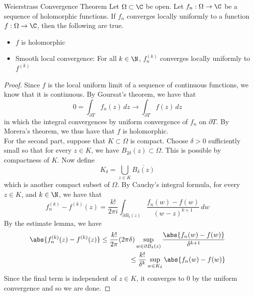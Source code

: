 \documentclass[a4paper]{article}
\begin{document}
\begin{thm}{Weierstrass Convergence Theorem}{} Let $\Omega\subset\C$ be open. Let $f_n:\Omega\to\C$ be a sequence of holomorphic functions. If $f_n$ converges locally uniformly to a function $f:\Omega\to\C$, then the following are true. 
\begin{itemize}
\item $f$ is holomorphic
\item Smooth local convergence: For all $k\in\N$, $f_n^{(k)}$ converges locally uniformly to $f^{(k)}$
\end{itemize} 
\begin{proof}
Since $f$ is the local uniform limit of a sequence of continuous functions, we know that it is continuous. By Goursat's theorem, we have that $$0=\int_{\partial T}f_n(z)\,dz\to\int_{\partial T}f(z)\,dz$$ in which the integral convergences by uniform convergence of $f_n$ on $\partial T$. By Morera's theorem, we thus have that $f$ is holomorphic. \\

For the second part, suppose that $K\subset\Omega$ is compact. Choose $\delta>0$ sufficiently small so that for every $z\in K$, we have $B_{2\delta}(z)\subset\Omega$. This is possible by compactness of $K$. Now define $$K_\delta=\bigcup_{z\in K}\overline{B_\delta(z)}$$ which is another compact subset of $\Omega$. By Cauchy's integral formula, for every $z\in K$, and $k\in\N$, we have that $$f_n^{(k)}-f^{(k)}(z)=\frac{k!}{2\pi i}\int_{\partial B_\delta(z)}\frac{f_n(w)-f(w)}{(w-z)^{k+1}}\,dw$$ By the estimate lemma, we have 
\begin{align*}
\abs{f_n^{(k)}(z)-f^{(k)}(z)}\leq\frac{k!}{2\pi}(2\pi\delta)\sup_{w\in\partial B_\delta(z)}\frac{\abs{f_n(w)-f(w)}}{\delta^{k+1}}\\
\leq\frac{k!}{\delta^k}\sup_{w\in K_\delta}\abs{f_n(w)-f(w)}
\end{align*}
Since the final term is independent of $z\in K$, it converges to $0$ by the uniform convergence and so we are done. 
\end{proof}
\end{thm}
\end{document}
